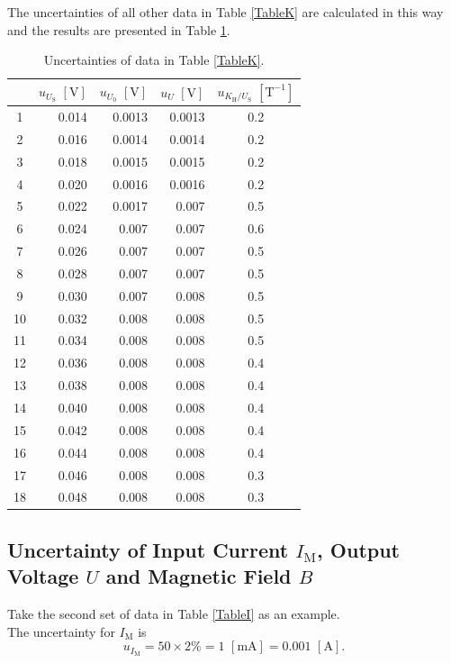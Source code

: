 \documentclass{article}
\begin{document}
The uncertainties of all other data in Table \ref{TableK} are calculated in this way and the results are presented in Table \ref{TableUncK}.

\begin{table}[H]
\centering
\begin{tabular}{crrrc}
\toprule
& $u_{U_\text{S}}\,\,[\text{V}]$ & $u_{U_0}\,\,[\text{V}]$ & $u_U\,\,[\text{V}]$ & $u_{K_\text{H}/U_\text{S}}\,\,[\text{T}^{-1}]$\\
\midrule
  1 & 0.014 & 0.0013 &0.0013 &0.2 \\
  2 & 0.016 & 0.0014 &0.0014 &0.2 \\
  3 & 0.018 & 0.0015 &0.0015 &0.2 \\
  4 & 0.020 & 0.0016 &0.0016 &0.2 \\
  5 & 0.022 & 0.0017& 0.007 & 0.5\\
  6 & 0.024 & 0.007 & 0.007 & 0.6\\
  7 & 0.026 & 0.007 & 0.007 & 0.5\\
  8 & 0.028 & 0.007 & 0.007 & 0.5\\
  9 & 0.030 & 0.007 & 0.008 & 0.5\\
  10 & 0.032 &0.008  &0.008  &0.5 \\
  11 & 0.034 &0.008  &0.008  &0.5 \\
  12 & 0.036 &0.008  &0.008  &0.4 \\
  13 & 0.038 &0.008  &0.008  &0.4 \\
  14 & 0.040 &0.008  &0.008  &0.4 \\
  15 & 0.042 &0.008  &0.008  &0.4 \\
  16 & 0.044 &0.008  &0.008  &0.4 \\
  17 & 0.046 &0.008  &0.008  &0.3 \\
  18 & 0.048 &0.008  &0.008  &0.3 \\
\bottomrule
\end{tabular}
\caption{Uncertainties of data in Table \ref{TableK}.}\label{TableUncK}
\end{table}

	\subsection{Uncertainty of Input Current $I_\text{M}$, Output Voltage $U$ and Magnetic Field $B$}

Take the second set of data in Table \ref{TableI} as an example.\\

The uncertainty for $I_\text{M}$ is
$$u_{I_\text{M}} = 50\times 2\% = 1\,\,[\text{mA}] = 0.001\,\,[\text{A}].$$
\end{document}
